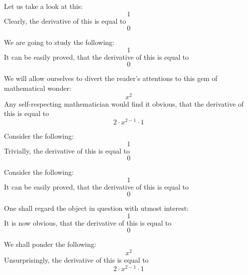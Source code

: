 \documentclass{article}
\begin{document}
Let us take a look at this:
\begin{equation}
1 
\end{equation}
Clearly, the derivative of this is equal to
\begin{equation}
0 
\end{equation}

We are going to study the following:
\begin{equation}
1 
\end{equation}
It can be easily proved, that the derivative of this is equal to
\begin{equation}
0 
\end{equation}

We will allow ourselves to divert the reader's attentions to this gem of mathematical wonder:
\begin{equation}
x ^{2 } 
\end{equation}
Any self-respecting mathematician would find it obvious, that the derivative of this is equal to
\begin{equation}
2 \cdot x ^{2 - 1 } \cdot 1 
\end{equation}

Consider the following:
\begin{equation}
1 
\end{equation}
Trivially, the derivative of this is equal to
\begin{equation}
0 
\end{equation}

Consider the following:
\begin{equation}
1 
\end{equation}
It can be easily proved, that the derivative of this is equal to
\begin{equation}
0 
\end{equation}

One shall regard the object in question with utmost interest:
\begin{equation}
1 
\end{equation}
It is now obvious, that the derivative of this is equal to
\begin{equation}
0 
\end{equation}

We shall ponder the following:
\begin{equation}
x ^{2 } 
\end{equation}
Unsurprisingly, the derivative of this is equal to
\begin{equation}
2 \cdot x ^{2 - 1 } \cdot 1 
\end{equation}
\end{document}
